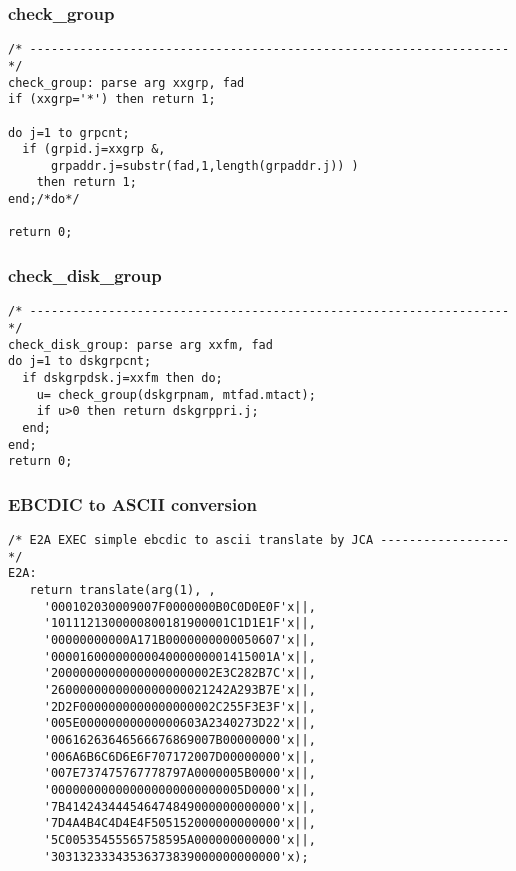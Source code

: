\subsubsection{check\_group}

\def\LPtopF{check\_group}

\begin{verbatim}
/* ------------------------------------------------------------------- */
check_group: parse arg xxgrp, fad
if (xxgrp='*') then return 1;

do j=1 to grpcnt;
  if (grpid.j=xxgrp &,
      grpaddr.j=substr(fad,1,length(grpaddr.j)) )
    then return 1;
end;/*do*/

return 0;
\end{verbatim}

\subsubsection{check\_disk\_group}

\def\LPtopF{check\_disk\_group}

\begin{verbatim}
/* ------------------------------------------------------------------- */
check_disk_group: parse arg xxfm, fad
do j=1 to dskgrpcnt;
  if dskgrpdsk.j=xxfm then do;
    u= check_group(dskgrpnam, mtfad.mtact);
    if u>0 then return dskgrppri.j;
  end;
end;
return 0;
\end{verbatim}

\subsubsection{EBCDIC to ASCII conversion}

\def\LPtopF{EBCDIC to ASCII conversion}

\begin{verbatim}
/* E2A EXEC simple ebcdic to ascii translate by JCA ------------------ */
E2A:
   return translate(arg(1), ,
     '000102030009007F0000000B0C0D0E0F'x||,
     '1011121300000800181900001C1D1E1F'x||,
     '00000000000A171B0000000000050607'x||,
     '0000160000000004000000001415001A'x||,
     '20000000000000000000002E3C282B7C'x||,
     '2600000000000000000021242A293B7E'x||,
     '2D2F0000000000000000002C255F3E3F'x||,
     '005E00000000000000603A2340273D22'x||,
     '00616263646566676869007B00000000'x||,
     '006A6B6C6D6E6F707172007D00000000'x||,
     '007E737475767778797A0000005B0000'x||,
     '000000000000000000000000005D0000'x||,
     '7B414243444546474849000000000000'x||,
     '7D4A4B4C4D4E4F505152000000000000'x||,
     '5C00535455565758595A000000000000'x||,
     '30313233343536373839000000000000'x);
\end{verbatim}

